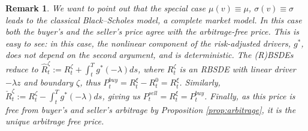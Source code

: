 \documentclass{article}
\newtheorem{remark}[definition]{Remark}
\begin{document}
\begin{remark}\label{rem:BS}
	We want to point out that the special case $\mu(v) \equiv \mu$, $\sigma(v) \equiv \sigma$ leads to the classical Black--Scholes model, a \textit{complete} market model. In this case both the buyer's and the seller's price agree with the arbitrage-free price. This is easy to see: in this case, the nonlinear component of the risk-adjusted drivers, $g^*$, does not depend on the second argument, and is deterministic. The (R)BSDEs reduce to $\hat{R}_t^\zeta:= R_t^\zeta +\int_t^Tg^*(-\lambda)ds$, where  $R^\zeta_t$ is an RBSDE with linear driver $-\lambda z$ and boundary $\zeta$, thus $P^{buy}_t= R_t^\xi -R_t^0=R_t^\xi$. Similarly, $\check{R}_t^\zeta:= R_t^\zeta -\int_t^Tg^*(-\lambda)ds$, giving us $P^{sell}_t= R_t^\xi = P^{buy}_t$.  Finally, as this price is free from buyer's and seller's arbitrage by Proposition \ref{prop:arbitrage}, it is the unique arbitrage free price. 
\end{remark}
\end{document}
